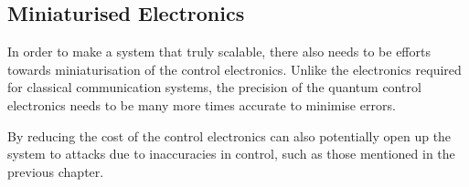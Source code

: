 \subsection{Miniaturised Electronics}

In order to make a system that truly scalable, there also needs to be efforts towards miniaturisation of the control electronics. Unlike the electronics required for classical communication systems, the precision of the quantum control electronics needs to be many more times accurate to minimise errors.

By reducing the cost of the control electronics can also potentially open up the system to attacks due to inaccuracies in control, such as those mentioned in the previous chapter. 

